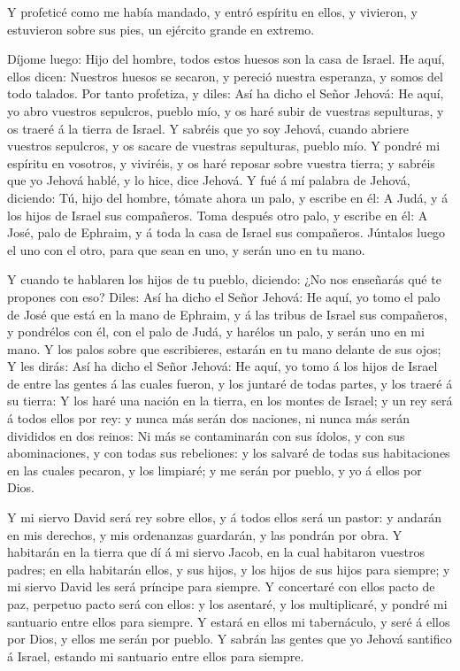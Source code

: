  Y profeticé como me había mandado, y entró espíritu en
ellos, y vivieron, y estuvieron sobre sus pies, un ejército grande en
extremo.

 Díjome luego: Hijo del hombre, todos estos huesos son la
casa de Israel. He aquí, ellos dicen: Nuestros huesos se secaron, y
pereció nuestra esperanza, y somos del todo talados.  Por
tanto profetiza, y diles: Así ha dicho el Señor Jehová: He aquí, yo abro
vuestros sepulcros, pueblo mío, y os haré subir de vuestras sepulturas,
y os traeré á la tierra de Israel.  Y sabréis que yo soy
Jehová, cuando abriere vuestros sepulcros, y os sacare de vuestras
sepulturas, pueblo mío.  Y pondré mi espíritu en vosotros,
y viviréis, y os haré reposar sobre vuestra tierra; y sabréis que yo
Jehová hablé, y lo hice, dice Jehová.  Y fué á mí palabra
de Jehová, diciendo:  Tú, hijo del hombre, tómate ahora un
palo, y escribe en él: A Judá, y á los hijos de Israel sus compañeros.
Toma después otro palo, y escribe en él: A José, palo de Ephraim, y á
toda la casa de Israel sus compañeros.  Júntalos luego el
uno con el otro, para que sean en uno, y serán uno en tu mano.

 Y cuando te hablaren los hijos de tu pueblo, diciendo: ¿No
nos enseñarás qué te propones con eso?  Diles: Así ha dicho
el Señor Jehová: He aquí, yo tomo el palo de José que está en la mano de
Ephraim, y á las tribus de Israel sus compañeros, y pondrélos con él,
con el palo de Judá, y harélos un palo, y serán uno en mi mano.
 Y los palos sobre que escribieres, estarán en tu mano
delante de sus ojos;  Y les dirás: Así ha dicho el Señor
Jehová: He aquí, yo tomo á los hijos de Israel de entre las gentes á las
cuales fueron, y los juntaré de todas partes, y los traeré á su tierra:
 Y los haré una nación en la tierra, en los montes de
Israel; y un rey será á todos ellos por rey: y nunca más serán dos
naciones, ni nunca más serán divididos en dos reinos:  Ni
más se contaminarán con sus ídolos, y con sus abominaciones, y con todas
sus rebeliones: y los salvaré de todas sus habitaciones en las cuales
pecaron, y los limpiaré; y me serán por pueblo, y yo á ellos por Dios.

 Y mi siervo David será rey sobre ellos, y á todos ellos
será un pastor: y andarán en mis derechos, y mis ordenanzas guardarán, y
las pondrán por obra.  Y habitarán en la tierra que dí á mi
siervo Jacob, en la cual habitaron vuestros padres; en ella habitarán
ellos, y sus hijos, y los hijos de sus hijos para siempre; y mi siervo
David les será príncipe para siempre.  Y concertaré con
ellos pacto de paz, perpetuo pacto será con ellos: y los asentaré, y los
multiplicaré, y pondré mi santuario entre ellos para siempre.
 Y estará en ellos mi tabernáculo, y seré á ellos por Dios,
y ellos me serán por pueblo.  Y sabrán las gentes que yo
Jehová santifico á Israel, estando mi santuario entre ellos para
siempre.

